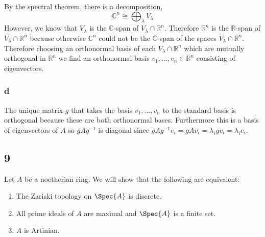 \documentclass[12pt]{article}
\newcommand{\R}{\mathbb{R}}
\renewcommand{\C}{\mathbb{C}}
\begin{document}
By the spectral theorem, there is a decomposition,
\[ \C^n \cong \bigoplus_{\lambda} V_\lambda \]
However, we know that $V_\lambda$ is the $\C$-span of $V_\lambda \cap \R^n$. Therefore $\R^n$ is the $\R$-span of $V_\lambda \cap \R^n$ because otherwise $\C^n$ could not be the $\C$-span of the spaces $V_\lambda \cap \R^n$. Therefore choosing an orthonormal basis of each $V_\lambda \cap \R^n$ which are mutually orthogonal in $\R^n$ we find an orthonormal basis $v_1, \dots, v_n \in \R^n$ consisting of eigenvectors.

\subsubsection{d}

The unique matrix $g$ that takes the basis $v_1, \dots, v_n$ to the standard basis is orthogonal because these are both orthonormal bases. Furthermore this is a basis of eigenvectors of $A$ so $g A g^{-1}$ is diagonal since $g A g^{-1} e_i = g A v_i = \lambda_i g v_i = \lambda_i e_i$.

\subsection{9}

Let $A$ be a noetherian ring. We will show that the following are equivalent:

\begin{enumerate}
\item The Zariski topology on $\Spec{A}$ is discrete.
\item All prime ideals of $A$ are maximal and $\Spec{A}$ is a finite set.
\item $A$ is Artinian.
\end{enumerate}
\end{document}
